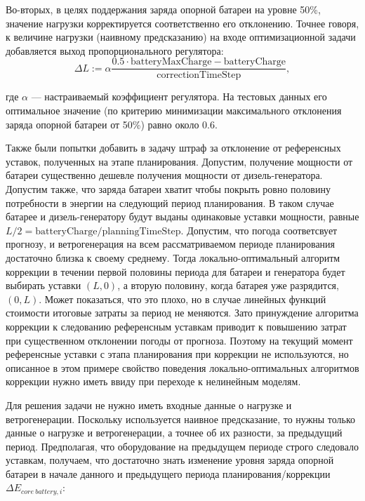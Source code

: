 \documentclass{report}
\begin{document}
        Во-вторых, в целях поддержания заряда опорной батареи на уровне 50\%, значение нагрузки корректируется соответственно его отклонению.
        Точнее говоря, к величине нагрузки (наивному предсказанию) на входе оптимизационной задачи добавляется выход пропорционального регулятора: 
        \begin{equation}
        \label{f:dL}
        \Delta L := \alpha \frac{0.5 \cdot  \text{batteryMaxCharge} -
        \text{batteryCharge}}{\text{correctionTimeStep}},
        \end{equation}
        
        где $\alpha$ --- настраиваемый коэффициент регулятора.
        На тестовых данных его оптимальное значение (по критерию минимизации максимального отклонения заряда опорной батареи от 50\%) равно около $0.6$.
        
        Также были попытки добавить в задачу штраф за отклонение от референсных уставок, полученных на этапе планирования.
        Допустим, получение мощности от батареи существенно дешевле получения мощности от дизель-генератора. Допустим также, что заряда батареи хватит чтобы покрыть ровно половину потребности в энергии на следующий период планирования.
        В таком случае батарее и дизель-генератору будут выданы одинаковые уставки мощности, равные
        $L/2 = \text{batteryCharge} / \text{planningTimeStep}$.
        Допустим, что погода соответсвует прогнозу, и ветрогенерация на всем рассматриваемом периоде планирования достаточно близка к своему среднему.
        Тогда локально-оптимальный алгоритм коррекции в течении первой половины периода для батареи и генератора будет выбирать уставки $(L, 0)$, а вторую половину, когда батарея уже разрядится, $(0, L)$.
        Может показаться, что это плохо, но в случае линейных функций стоимости итоговые затраты за период не меняются. 
        Зато принуждение алгоритма коррекции к следованию референсным уставкам приводит к повышению затрат при существенном отклонении погоды от прогноза. 
        Поэтому на текущий момент референсные уставки с этапа планирования при коррекции не используются, но описанное в этом примере свойство поведения локально-оптимальных алгоритмов коррекции нужно иметь ввиду при переходе к нелинейным моделям.
        
        Для решения задачи не нужно иметь входные данные о нагрузке и ветрогенерации.
        Поскольку используется наивное предсказание, то нужны только данные о нагрузке и ветрогенерации, а точнее об их разности, за предыдущий период.
        Предполагая, что оборудование на предыдущем периоде строго следовало уставкам, получаем, что достаточно знать изменение  уровня заряда опорной батареи в начале данного и предыдущего периода планирования/коррекции 
        $\Delta E_{core~battery, i}$:
        
\end{document}

